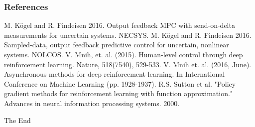 \documentclass{beamer}
\begin{document}
\begin{frame}
\frametitle{References}
\footnotesize{
\begin{thebibliography}{99}
 M. K\"{o}gel and R. Findeisen 2016. Output feedback MPC with send-on-delta measurements for 
uncertain systems. NECSYS.
 M. K\"{o}gel and R. Findeisen 2016. Sampled-data, output feedback predictive control for uncertain,
nonlinear systems. NOLCOS.
  V. Mnih, et. al. (2015). 
 Human-level control through deep reinforcement learning. Nature, 518(7540), 529-533.
  V. Mnih et. al. (2016, June). Asynchronous methods for deep reinforcement learning. 
 In International Conference on Machine Learning (pp. 1928-1937).
  R.S. Sutton et al. "Policy gradient methods for reinforcement learning with function approximation." 
 Advances in neural information processing systems. 2000.
\end{thebibliography}
}
\end{frame}
\begin{frame}
\Huge{\centerline{The End}}
\end{frame}

\end{document}
